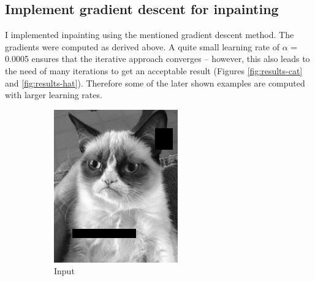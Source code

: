 \documentclass{paper}
\begin{document}
\subsection*{Implement gradient descent for inpainting}
I implemented inpainting using the mentioned gradient descent method. The gradients were computed as derived above. 
A quite small learning rate of $\alpha$ = 0.0005 ensures that the iterative approach converges -- however, this also leads to the need of many iterations to get an acceptable result (Figures \ref{fig:results-cat} and \ref{fig:results-hat}). Therefore some of the later shown examples are computed with larger learning rates.
\begin{figure}[ht]
\centering
\begin{subfigure}[h]{0.45\textwidth}
	\centering
	\includegraphics[width=\textwidth]{cat-input}
	\caption*{Input}
\end{subfigure}
~
\begin{subfigure}[ht]{0.45\textwidth}
	\centering

\end{subfigure}
\end{figure}
\end{document}
